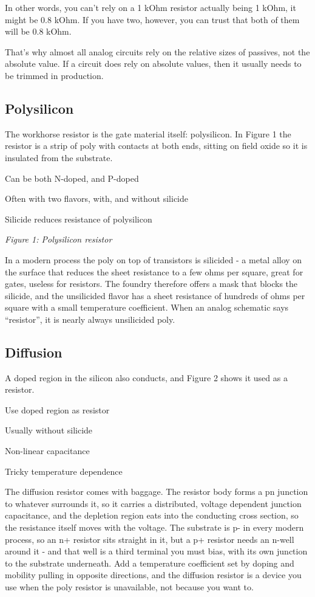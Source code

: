 In other words, you can't rely on a 1 kOhm resistor actually being 1
kOhm, it might be 0.8 kOhm. If you have two, however, you can trust that
both of them will be 0.8 kOhm.

That's why almost all analog circuits rely on the relative sizes of
passives, not the absolute value. If a circuit does rely on absolute
values, then it usually needs to be trimmed in production.

\subsection{Polysilicon}\label{polysilicon}

The workhorse resistor is the gate material itself: polysilicon. In
Figure 1 the resistor is a strip of poly with contacts at both ends,
sitting on field oxide so it is insulated from the substrate.

Can be both N-doped, and P-doped

Often with two flavors, with, and without silicide

Silicide reduces resistance of polysilicon


{
\centering
{}
}

\emph{Figure 1: Polysilicon resistor}

In a modern process the poly on top of transistors is silicided - a
metal alloy on the surface that reduces the sheet resistance to a few
ohms per square, great for gates, useless for resistors. The foundry
therefore offers a mask that blocks the silicide, and the unsilicided
flavor has a sheet resistance of hundreds of ohms per square with a
small temperature coefficient. When an analog schematic says
``resistor'', it is nearly always unsilicided poly.

\subsection{Diffusion}\label{diffusion}

A doped region in the silicon also conducts, and Figure 2 shows it used
as a resistor.

Use doped region as resistor

Usually without silicide

Non-linear capacitance

Tricky temperature dependence

The diffusion resistor comes with baggage. The resistor body forms a pn
junction to whatever surrounds it, so it carries a distributed, voltage
dependent junction capacitance, and the depletion region eats into the
conducting cross section, so the resistance itself moves with the
voltage. The substrate is p- in every modern process, so an n+ resistor
sits straight in it, but a p+ resistor needs an n-well around it - and
that well is a third terminal you must bias, with its own junction to
the substrate underneath. Add a temperature coefficient set by doping
and mobility pulling in opposite directions, and the diffusion resistor
is a device you use when the poly resistor is unavailable, not because
you want to.


